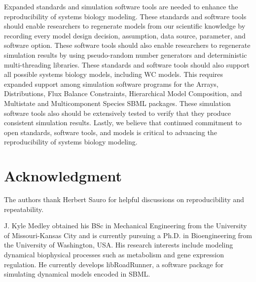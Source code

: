 \documentclass[journal,transmag,twoside]{IEEEtran}
\begin{document}
Expanded standards and simulation software tools are needed to enhance the reproducibility of systems biology modeling. These standards and software tools should enable researchers to regenerate models from our scientific knowledge by recording every model design decision, assumption, data source, parameter, and software option. These software tools should also enable researchers to regenerate simulation results by using pseudo-random number generators and deterministic multi-threading libraries. These standards and software tools should also support all possible systems biology models, including WC models. This requires expanded support among simulation software programs for the Arrays, Distributions, Flux Balance Constraints, Hierarchical Model Composition, and Multistate and Multicomponent Species SBML packages. These simulation software tools also should be extensively tested to verify that they produce consistent simulation results. Lastly, we believe that continued commitment to open standards, software tools, and models is critical to advancing the reproducibility of systems biology modeling.

\section{Acknowledgment}

The authors thank Herbert Sauro for helpful discussions
on reproducibility and repeatability.

\ifCLASSOPTIONcaptionsoff
  \newpage
\fi




\begin{IEEEbiography}{J. Kyle Medley}
obtained his BSc in Mechanical Engineering from the University of Missouri-Kansas City and
is currently pursuing a Ph.D. in Bioengineering from the University of Washington, USA.
His research interests include modeling dynamical biophysical processes such as
metabolism and gene expression regulation.
He currently develops libRoadRunner, a software package for simulating dynamical models encoded in SBML.
\end{IEEEbiography}
\end{document}
